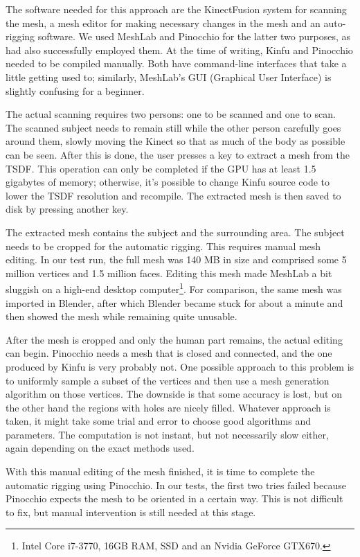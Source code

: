 The software needed for this approach are the KinectFusion system for scanning the mesh, a mesh editor for making necessary changes in the mesh and an auto-rigging software. We used MeshLab and Pinocchio for the latter two purposes, as \citet{charpentier2011accurate} had also successfully employed them. At the time of writing, Kinfu and Pinocchio needed to be compiled manually. Both have command-line interfaces that take a little getting used to; similarly, MeshLab's GUI (Graphical User Interface) is slightly confusing for a beginner.

The actual scanning requires two persons: one to be scanned and one to scan. The scanned subject needs to remain still while the other person carefully goes around them, slowly moving the Kinect so that as much of the body as possible can be seen. After this is done, the user presses a key to extract a mesh from the TSDF. This operation can only be completed if the GPU has at least 1.5 gigabytes of memory; otherwise, it's possible to change Kinfu source code to lower the TSDF resolution and recompile. The extracted mesh is then saved to disk by pressing another key.

The extracted mesh contains the subject and the surrounding area. The subject needs to be cropped for the automatic rigging. This requires manual mesh editing. In our test run, the full mesh was 140 MB in size and comprised some 5 million vertices and 1.5 million faces. Editing this mesh made MeshLab a bit sluggish on a high-end desktop computer\footnote{Intel Core i7-3770, 16GB RAM, SSD and an Nvidia GeForce GTX670.}. For comparison, the same mesh was imported in Blender, after which Blender became stuck for about a minute and then showed the mesh while remaining quite unusable.

After the mesh is cropped and only the human part remains, the actual editing can begin. Pinocchio needs a mesh that is closed and connected, and the one produced by Kinfu is very probably not. One possible approach to this problem is to uniformly sample a subset of the vertices and then use a mesh generation algorithm on those vertices. The downside is that some accuracy is lost, but on the other hand the regions with holes are nicely filled. Whatever approach is taken, it might take some trial and error to choose good algorithms and parameters. The computation is not instant, but not necessarily slow either, again depending on the exact methods used.

With this manual editing of the mesh finished, it is time to complete the automatic rigging using Pinocchio. In our tests, the first two tries failed because Pinocchio expects the mesh to be oriented in a certain way. This is not difficult to fix, but manual intervention is still needed at this stage.

